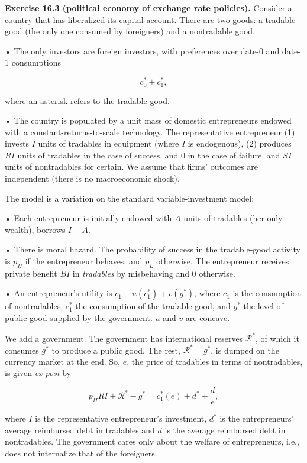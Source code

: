 \documentclass[11pt,a4paper]{article}
\begin{document}
\textbf{Exercise 16.3 (political economy of exchange rate policies).} Consider a country that has
liberalized its capital account. There are two goods: a tradable good (the only one consumed by
foreigners) and a nontradable good.

• The only investors are foreign investors, with preferences over date-0 and date-1 consumptions

\[c_0^* + c_1^*,\]

where an asterisk refers to the tradable good.

• The country is populated by a unit mass of domestic entrepreneurs endowed with a
constant-returns-to-scale technology. The representative entrepreneur (1) invests \(I\) units of
tradables in equipment (where \(I\) is endogenous), (2) produces \(RI\) units of tradables in the
case of success, and 0 in the case of failure, and \(SI\) units of nontradables for certain. We
assume that firms' outcomes are independent (there is no macroeconomic shock).

The model is a variation on the standard variable-investment model:

• Each entrepreneur is initially endowed with \(A\) units of tradables (her only wealth), borrows
\(I - A\).

• There is moral hazard. The probability of success in the tradable-good activity is \(p_H\) if the
entrepreneur behaves, and \(p_L\) otherwise. The entrepreneur receives private benefit \(BI\) in
\emph{tradables} by misbehaving and 0 otherwise.

• An entrepreneur's utility is \(c_1 + u(c_1^*) + v(g^*)\), where \(c_1\) is the consumption of
nontradables, \(c_1^*\) the consumption of the tradable good, and \(g^*\) the level of public good
supplied by the government. \(u\) and \(v\) are concave.

We add a government. The government has international reserves \(\mathcal{R}^*\), of which it
consumes \(g^*\) to produce a public good. The rest, \(\mathcal{R}^* - g^*\), is dumped on the
currency market at the end. So, \(e\), the price of tradables in terms of nontradables, is given
\emph{ex post} by

\[p_H RI + \mathcal{R}^* - g^* = c_1^*(e) + d^* + \frac{d}{e},\]

where \(I\) is the representative entrepreneur's investment, \(d^*\) is the entrepreneurs' average
reimbursed debt in tradables and \(d\) is the average reimbursed debt in nontradables. The
government cares only about the welfare of entrepreneurs, i.e., does not internalize that of the
foreigners.
\end{document}
